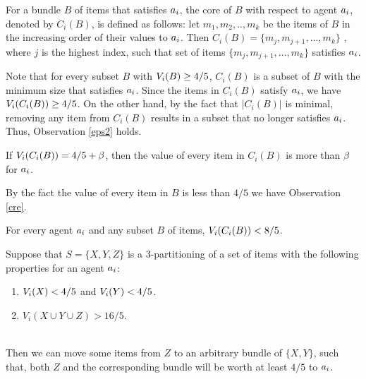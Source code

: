 \begin{definition}
\label{core}
For a bundle $B$ of items that satisfies $a_i$, the core of $B$ with respect to agent $a_i$, denoted by $C_i(B)$, is defined as follows: let $m_1,m_2,..,m_k$ be the items of $B$ in the increasing order of their values to $a_i$. Then $C_i(B) = \{m_j,m_{j+1},...,m_{k}\}$ , where $j$ is the highest index, such that set of items $\{m_j,m_{j+1},...,m_k\}$ satisfies $a_i$.
\end{definition}

Note that for every subset $B$ with $V_i(B) \geq 4/5$, $C_i(B)$ is a subset of $B$ with the minimum size that satisfies $a_i$. Since the items in $C_i(B)$ satisfy $a_i$, we have $V_i(C_i(B))\geq 4/5$. On the other hand, by the fact that $|C_i(B)|$ is minimal, removing any item from $C_i(B)$ results in a subset that no longer satisfies $a_i$. Thus, Observation \ref{eps2} holds.

\begin{observation}\label{eps2} 
If $V_i(C_i(B))  = 4/5 + \beta$, then the value of every item in $C_i(B)$ is more than $\beta$ for $a_i$.
\end{observation}

By the fact the value of every item in $B$ is less than $4/5$ we have Observation \ref{cre}.

\begin{observation}\label{cre}
For every agent $a_i$ and any subset $B$ of items, $V_i(C_i(B))<8/5$.
\end{observation}


\begin{lemma}
\label{3p}
Suppose that $S = \{X,Y,Z\}$ is a 3-partitioning of a set of items with the following properties for an agent $a_i$: 

\begin{minipage}[t]{\linegoal}
\begin{enumerate}[leftmargin=*]
\item $V_i(X) < 4/5$ and $V_i(Y)<4/5$. 

\item $V_i(X\cup Y \cup Z) >16/5$. 
\end{enumerate}
\end{minipage}
\\

Then we can move some items from $Z$ to an arbitrary bundle of $\{X, Y\}$, such that, both $Z$ and the corresponding bundle will be worth at least $4/5$ to $a_i$. 

\end{lemma}

